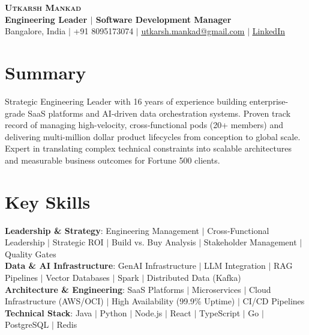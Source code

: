 \documentclass[letterpaper,11pt]{article}
\begin{document}
\begin{center}
    \textbf{\Huge \scshape Utkarsh Mankad} \\ \vspace{4pt} 
    \textbf{Engineering Leader $|$ Software Development Manager}\\ \vspace{4pt}
    \small
    Bangalore, India $|$ +91 8095173074 $|$ \href{mailto:utkarsh.mankad@gmail.com}{\underline{utkarsh.mankad@gmail.com}} $|$ \href{https://linkedin.com/in/utkarsh-mankad}{\underline{LinkedIn}}
\end{center}

\section{Summary}
Strategic Engineering Leader with 16 years of experience building enterprise-grade SaaS platforms and AI-driven data orchestration systems. Proven track record of managing high-velocity, cross-functional pods (20+ members) and delivering multi-million dollar product lifecycles from conception to global scale. Expert in translating complex technical constraints into scalable architectures and measurable business outcomes for Fortune 500 clients.

\section{Key Skills}
 \begin{itemize}[leftmargin=0.15in, label={}]
    \small{\item{
     \textbf{Leadership \& Strategy}{: Engineering Management $|$ Cross-Functional Leadership $|$ Strategic ROI $|$ Build vs. Buy Analysis $|$ Stakeholder Management $|$ Quality Gates} \\ \vspace{3pt}
     \textbf{Data \& AI Infrastructure}{: GenAI Infrastructure $|$ LLM Integration $|$ RAG Pipelines $|$ Vector Databases $|$ Spark $|$ Distributed Data (Kafka)} \\ \vspace{3pt}
     \textbf{Architecture \& Engineering}{: SaaS Platforms $|$ Microservices $|$ Cloud Infrastructure (AWS/OCI) $|$ High Availability (99.9\% Uptime) $|$ CI/CD Pipelines} \\ \vspace{3pt}
     \textbf{Technical Stack}{: Java $|$ Python $|$ Node.js $|$ React $|$ TypeScript $|$ Go $|$ PostgreSQL $|$ Redis}
    }}
 \end{itemize}
\end{document}
